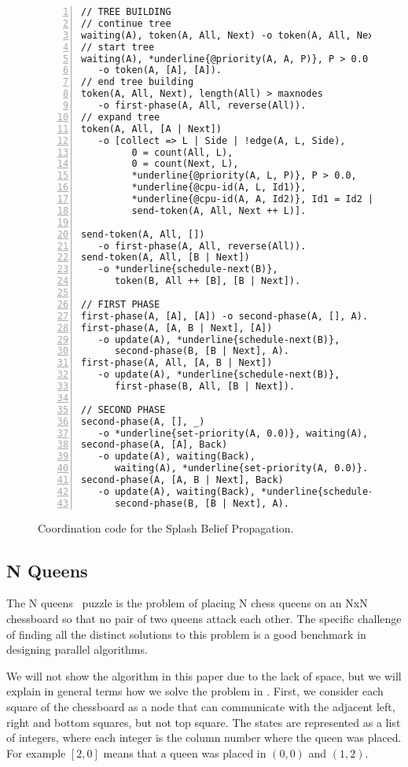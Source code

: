 \begin{figure}[h!]
\small\begin{Verbatim}[numbers=left,commandchars=*\{\}]
// TREE BUILDING
// continue tree
waiting(A), token(A, All, Next) -o token(A, All, Next).
// start tree
waiting(A), *underline{@priority(A, A, P)}, P > 0.0
   -o token(A, [A], [A]).
// end tree building
token(A, All, Next), length(All) > maxnodes
   -o first-phase(A, All, reverse(All)).
// expand tree
token(A, All, [A | Next])
   -o [collect => L | Side | !edge(A, L, Side),
         0 = count(All, L),
         0 = count(Next, L),
         *underline{@priority(A, L, P)}, P > 0.0,
         *underline{@cpu-id(A, L, Id1)},
         *underline{@cpu-id(A, A, Id2)}, Id1 = Id2 |
         send-token(A, All, Next ++ L)].

send-token(A, All, [])
   -o first-phase(A, All, reverse(All)).
send-token(A, All, [B | Next])
   -o *underline{schedule-next(B)},
      token(B, All ++ [B], [B | Next]).

// FIRST PHASE
first-phase(A, [A], [A]) -o second-phase(A, [], A).
first-phase(A, [A, B | Next], [A])
   -o update(A), *underline{schedule-next(B)},
      second-phase(B, [B | Next], A).
first-phase(A, All, [A, B | Next])
   -o update(A), *underline{schedule-next(B)},
      first-phase(B, All, [B | Next]).

// SECOND PHASE
second-phase(A, [], _)
   -o *underline{set-priority(A, 0.0)}, waiting(A), update(A).
second-phase(A, [A], Back)
   -o update(A), waiting(Back),
      waiting(A), *underline{set-priority(A, 0.0)}.
second-phase(A, [A, B | Next], Back)
   -o update(A), waiting(Back), *underline{schedule-next(B)},
      second-phase(B, [B | Next], A).
\end{Verbatim}
  \caption{Coordination code for the Splash Belief Propagation.}
  \label{code:sbp}
\end{figure}
\normalsize

\subsection{N Queens}

The N queens~\cite{8queens} puzzle is the problem of placing N chess queens on an NxN chessboard so
that no pair of two queens attack each other. The specific challenge of finding all the distinct
solutions to this problem is a good benchmark in designing parallel algorithms.

We will not show the algorithm in this paper due to the lack of space, but we will explain in general
terms how we solve the problem in \lang. First, we consider each square of the chessboard as a node
that can communicate with the adjacent left, right and bottom squares, but not top square.
The states are represented as a list of integers, where each integer is the column number where
the queen was placed. For example $[2, 0]$ means that a queen was placed in $(0, 0)$ and $(1, 2)$.

